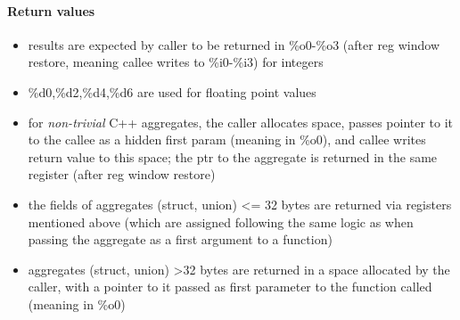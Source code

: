 \paragraph{Return values}

\begin{itemize}
\item results are expected by caller to be returned in \%o0-\%o3 (after reg window restore, meaning callee writes to \%i0-\%i3) for integers
\item \%d0,\%d2,\%d4,\%d6 are used for floating point values
\item for {\it non-trivial} C++ aggregates, the caller allocates space, passes pointer to it to the callee as a hidden first param
(meaning in \%o0), and callee writes return value to this space; the ptr to the aggregate is returned in the same register (after reg window restore)
\item the fields of aggregates (struct, union) \textless= 32 bytes are returned via registers mentioned above (which are
assigned following the same logic as when passing the aggregate as a first argument to a function)
\item aggregates (struct, union) \textgreater 32 bytes are returned in a space allocated by the caller, with a pointer to it
passed as first parameter to the function called (meaning in \%o0)

\end{itemize}
